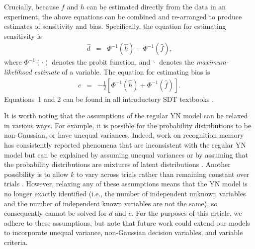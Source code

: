 \documentclass[man]{apa6}
\begin{document}
Crucially, because $f$ and $h$ can be estimated directly from the data in an experiment, the above equations can be combined and re-arranged to produce estimates of sensitivity and bias. Specifically, the equation for estimating sensitivity is
\begin{eqnarray}
\hat{d}&=&\Phi^{-1}\left(\hat{h}\right)-\Phi^{-1}\left(\hat{f}\right)\textrm{,}
\label{eq1}
\end{eqnarray}where $\Phi^{-1}\left(\cdot\right)$ denotes the probit function, and $\hat{\cdot}$ denotes the \emph{maximum-likelihood estimate} of a variable. The equation for estimating bias is
\begin{eqnarray}
\hat{c}&=&-\frac{1}{2}\left[\Phi^{-1}\left(\hat{h}\right)+\Phi^{-1}\left(\hat{f}\right)\right]\textrm{.}
\label{eq2}
\end{eqnarray}
Equations~1 and 2 can be found in all introductory SDT textbooks \parencite[e.g.,][]{Green1966, Macmillan2005}.

It is worth noting that the assumptions of the regular YN model can be relaxed in various ways. For example, it is possible for the probability distributions to be non-Gaussian, or have unequal variances. Indeed, work on recognition memory has consistently reported phenomena that are inconsistent with the regular YN model but can be explained by assuming unequal variances \parencite{Wixted2007, Yonelinas2007} or by assuming that the probability distributions are mixtures of latent distributions \parencite{decarlosignal2002}. Another possibility is to allow $k$ to vary across trials rather than remaining constant over trials \parencite{cabreraseparating2015}. However, relaxing any of these assumptions means that the YN model is no longer exactly identified (i.e., the number of independent unknown variables and the number of independent known variables are not the same), so consequently cannot be solved for $d$ and $c$. For the purposes of this article, we adhere to these assumptions, but note that future work could extend our models to incorporate unequal variance, non-Gaussian decision variables, and variable criteria.
\end{document}
